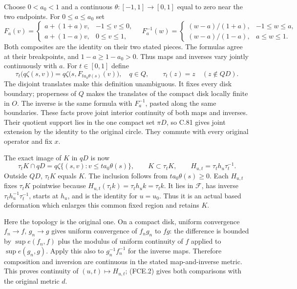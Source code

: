 Choose $0<a_0<1$ and a continuous
$\theta:[-1,1]\to[0,1]$ equal to zero near the two endpoints.
For $0\leq a\leq a_0$ set
\[
 F_a(v)=
 \begin{cases}a+(1+a)v,&-1\leq v\leq0,\\
               a+(1-a)v,&0\leq v\leq1,
 \end{cases}
 \quad
 F_a^{-1}(w)=
 \begin{cases}(w-a)/(1+a),&-1\leq w\leq a,\\
               (w-a)/(1-a),&a\leq w\leq1.
 \end{cases}                                                   \tag{FCE.7}
\]
Both composites are the identity on their two stated pieces.
The formulas agree at their breakpoints, and $1-a\geq1-a_0>0$.
Thus maps and inverses vary jointly continuously with $a$.
For $t\in[0,1]$ define
\[
 \tau_t\bigl(q\zeta(s,v)\bigr)
       =q\zeta\bigl(s,F_{t a_0\theta(s)}(v)\bigr),
       \quad q\in Q,
 \qquad
 \tau_t(z)=z\quad(z\notin QD).
                                                               \tag{FCE.8}
\]
The disjoint translates make this definition unambiguous.
It fixes every disk boundary; properness of $Q$ makes the
translates of the compact disk locally finite in $O$. The
inverse is the same formula with $F_a^{-1}$, pasted along
the same boundaries. These facts prove joint interior
continuity of both maps and inverses. Their quotient support
lies in the one compact set $\pi D$, so C.81 gives joint
extension by the identity to the original circle. They
commute with every original operator and fix $x$.

The exact image of $K$ in $qD$ is now
\[
 \tau_tK\cap qD
   =q\zeta\{(s,v):v\leq t a_0\theta(s)\},\qquad
 K\subset\tau_tK,
 \qquad
 H_{u,t}=\tau_t h_u\tau_t^{-1}.
                                                               \tag{FCE.9}
\]
Outside $QD$, $\tau_tK$ equals $K$. The inclusion follows
from $t a_0\theta(s)\geq0$. Each $H_{u,t}$ fixes
$\tau_tK$ pointwise because
$H_{u,t}(\tau_tk)=\tau_th_uk=\tau_tk$.
It lies in $\mathscr F$, has inverse
$\tau_t h_u^{-1}\tau_t^{-1}$, starts at $h_u$, and is the
identity for $u=u_0$. Thus it is an actual based deformation
which enlarges this common fixed region and retains $K$.

Here the topology is the original one. On a compact disk,
uniform convergence $f_n\to f$, $g_n\to g$ gives uniform
convergence of $f_ng_n$ to $fg$: the difference is bounded
by $\sup e(f_n,f)$ plus the modulus of uniform continuity
of $f$ applied to $\sup e(g_n,g)$. Apply this also to
$g_n^{-1}f_n^{-1}$ for the inverse maps. Therefore composition
and inversion are continuous in the stated map-and-inverse
metric. This proves continuity of $(u,t)\mapsto H_{u,t}$;
(FCE.2) gives both comparisons with the original metric $d$.

